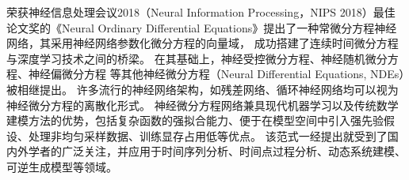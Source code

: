 
荣获神经信息处理会议2018（Neural Information Processing，NIPS 2018）最佳论文奖的《Neural Ordinary Differential Equations》\cite{chen2018neural}提出了一种常微分方程神经网络，其采用神经网络参数化微分方程的向量域\cite{kidger2021}，
成功搭建了连续时间微分方程与深度学习技术之间的桥梁。
在其基础上，神经受控微分方程\cite{kidger2020neural}、神经随机微分方程\cite{li2020scalable}、神经偏微分方程
\cite{li2020fourier}等其他神经微分方程（Neural Differential Equations, NDEs）被相继提出。
许多流行的神经网络架构，如残差网络、循环神经网络均可以视为神经微分方程的离散化形式。
神经微分方程网络兼具现代机器学习以及传统数学建模方法的优势，包括复杂函数的强拟合能力、便于在模型空间中引入强先验假设、处理非均匀采样数据、训练显存占用低等优点。
该范式一经提出就受到了国内外学者的广泛关注，并应用于时间序列分析、时间点过程分析、动态系统建模、可逆生成模型等领域。



